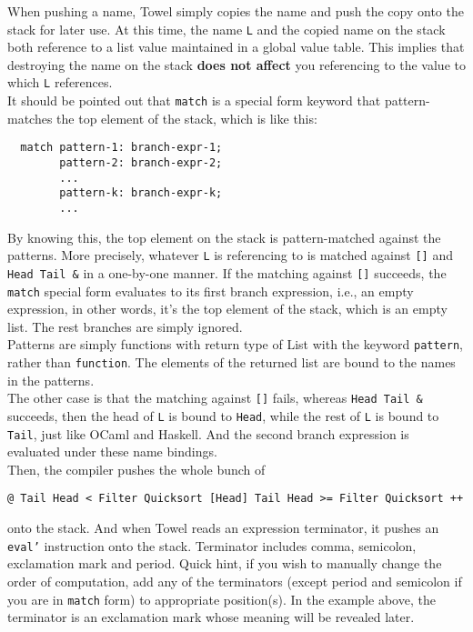 \documentclass{article}
\begin{document}
When pushing a name, Towel simply copies the name and push the copy onto the stack for later use. At this time, the name \texttt{L} and the copied name on the stack both reference to a list value maintained in a global value table. This implies that destroying the name on the stack \textbf{does not affect} you referencing to the value to which \texttt{L} references.\\

It should be pointed out that \texttt{match} is a special form keyword that pattern-matches the top element of the stack, which is like this:

\begin{Verbatim}
  match pattern-1: branch-expr-1;
        pattern-2: branch-expr-2;
        ...
        pattern-k: branch-expr-k;
        ...
\end{Verbatim}

By knowing this, the top element on the stack is pattern-matched against the patterns. More precisely, whatever \texttt{L} is referencing to is matched against \texttt{[]} and \texttt{Head Tail \&} in a one-by-one manner. If the matching against \texttt{[]} succeeds, the \texttt{match} special form evaluates to its first branch expression, i.e., an empty expression, in other words, it's the top element of the stack, which is an empty list. The rest branches are simply ignored.\\

Patterns are simply functions with return type of List with the keyword \texttt{pattern}, rather than \texttt{function}. The elements of the returned list are bound to the names in the patterns.\\

The other case is that the matching against \texttt{[]} fails, whereas \texttt{Head Tail \&} succeeds, then the head of \texttt{L} is bound to \texttt{Head}, while the rest of \texttt{L} is bound to \texttt{Tail}, just like OCaml and Haskell. And the second branch expression is evaluated under these name bindings.\\

Then, the compiler pushes the whole bunch of \newline

\texttt{@ Tail Head < Filter Quicksort [Head] Tail Head >= Filter Quicksort ++}\newline

onto the stack. And when Towel reads an expression terminator, it pushes an \texttt{eval'} instruction onto the stack. Terminator includes comma, semicolon, exclamation mark and period. Quick hint, if you wish to manually change the order of computation, add any of the terminators (except period and semicolon if you are in \texttt{match} form) to appropriate position(s). In the example above, the terminator is an exclamation mark whose meaning will be revealed later.\\
\end{document}

